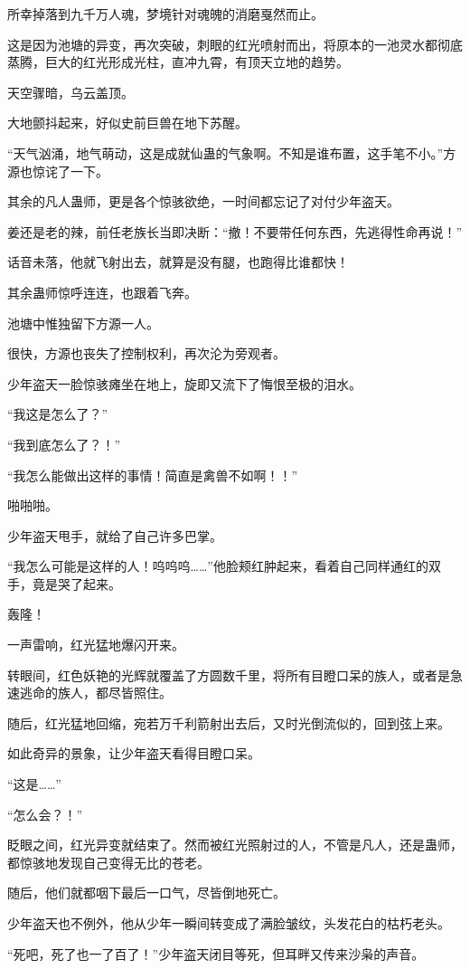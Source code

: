 \begin{this_body}
所幸掉落到九千万人魂，梦境针对魂魄的消磨戛然而止。

这是因为池塘的异变，再次突破，刺眼的红光喷射而出，将原本的一池灵水都彻底蒸腾，巨大的红光形成光柱，直冲九霄，有顶天立地的趋势。

天空骤暗，乌云盖顶。

大地颤抖起来，好似史前巨兽在地下苏醒。

“天气汹涌，地气萌动，这是成就仙蛊的气象啊。不知是谁布置，这手笔不小。”方源也惊诧了一下。

其余的凡人蛊师，更是各个惊骇欲绝，一时间都忘记了对付少年盗天。

姜还是老的辣，前任老族长当即决断：“撤！不要带任何东西，先逃得性命再说！”

话音未落，他就飞射出去，就算是没有腿，也跑得比谁都快！

其余蛊师惊呼连连，也跟着飞奔。

池塘中惟独留下方源一人。

很快，方源也丧失了控制权利，再次沦为旁观者。

少年盗天一脸惊骇瘫坐在地上，旋即又流下了悔恨至极的泪水。

“我这是怎么了？”

“我到底怎么了？！”

“我怎么能做出这样的事情！简直是禽兽不如啊！！”

啪啪啪。

少年盗天甩手，就给了自己许多巴掌。

“我怎么可能是这样的人！呜呜呜……”他脸颊红肿起来，看着自己同样通红的双手，竟是哭了起来。

轰隆！

一声雷响，红光猛地爆闪开来。

转眼间，红色妖艳的光辉就覆盖了方圆数千里，将所有目瞪口呆的族人，或者是急速逃命的族人，都尽皆照住。

随后，红光猛地回缩，宛若万千利箭射出去后，又时光倒流似的，回到弦上来。

如此奇异的景象，让少年盗天看得目瞪口呆。

“这是……”

“怎么会？！”

眨眼之间，红光异变就结束了。然而被红光照射过的人，不管是凡人，还是蛊师，都惊骇地发现自己变得无比的苍老。

随后，他们就都咽下最后一口气，尽皆倒地死亡。

少年盗天也不例外，他从少年一瞬间转变成了满脸皱纹，头发花白的枯朽老头。

“死吧，死了也一了百了！”少年盗天闭目等死，但耳畔又传来沙枭的声音。


\end{this_body}
